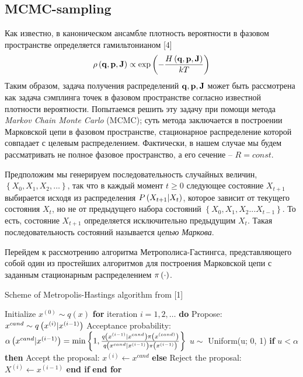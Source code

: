 \subsection{MCMC-sampling}

Как известно, в каноническом ансамбле плотность вероятности в фазовом пространстве определяется гамильтонианом [4]
\begin{gather}
	\rho \left( \mathbf{q}, \mathbf{p}, \mathbf{J} \right) \propto \exp \left( - \frac{H \left( \mathbf{q}, \mathbf{p}, \mathbf{J} \right)}{k T} \right)  \notag
\end{gather}
Таким образом, задача получения распределений $\mathbf{q}, \mathbf{p}, \mathbf{J}$ может быть рассмотрена как задача сэмплинга точек в фазовом пространстве согласно известной плотности вероятности. Попытаемся решить эту задачу при помощи метода \textit{Markov Chain Monte Carlo} (MCMC); суть метода заключается в построении Марковской цепи в фазовом пространстве, стационарное распределение которой совпадает с целевым распределением. Фактически, в нашем случае мы будем рассматривать не полное фазовое пространство, а его сечение -- $R = const$. \par
Предположим мы генерируем последовательность случайных величин, $\left\{ X_0, X_1, X_2, \dots \right\}$, так что в каждый момент $t \geq 0$ следующее состояние $X_{t + 1}$ выбирается исходя из распределения $P \left( X_{t+1} | X_t \right)$, которое зависит от текущего состояния $X_t$, но не от предыдущего набора состояний $\left\{ X_0, X_1, X_2 ... X_{t - 1} \right\}$. То есть, состояние $X_{t + 1}$ определяется исключительно предыдущим $X_t$. Такая последовательность состояний называется \textit{цепью Маркова}. \par
Перейдем к рассмотрению алгоритма Метрополиса-Гастингса, представляющего собой один из простейших алгоритмов для построения Марковской цепи с заданным стационарным распределением $\pi \left( \cdot \right)$.

\begin{algorithm}
\begin{algorithmic}[2]
		\caption{Scheme of Metropolis-Hastings algorithm from [1]}\label{metropolis}
\State Initialize $x^{(0)} \sim q(x)$
\State \textbf{for} iteration $i = 1, 2, \dots$ \textbf{do}
\State \quad Propose: $x^{cand} \sim q \left( x^{(i)} | x^{(i-1)} \right)$
\State \quad Acceptance probability:
\State \qquad $\alpha \left( x^{cand} | x^{(i-1)} \right) = \min \left\{ 1, \frac{q \left( x^{(i-1)} | x^{cand} \right) \pi \left( x^{(cand)} \right) }{ q \left( x^{cand} | x^{(i-1)} \right) \pi \left( x^{(i-1)} \right)} \right\}$
\State \quad $u \sim$ Uniform(u; 0, 1)
\State \quad \textbf{if} $u < \alpha$ \textbf{then}
\State \qquad Accept the proposal: $x^{(i)} \gets x^{cand}$
\State \quad \textbf{else}
\State \qquad Reject the proposal: $X^{(i)} \gets x^{(i-1)}$
\State \quad \textbf{end if}
\State \textbf{end for}
\end{algorithmic}
\end{algorithm}

